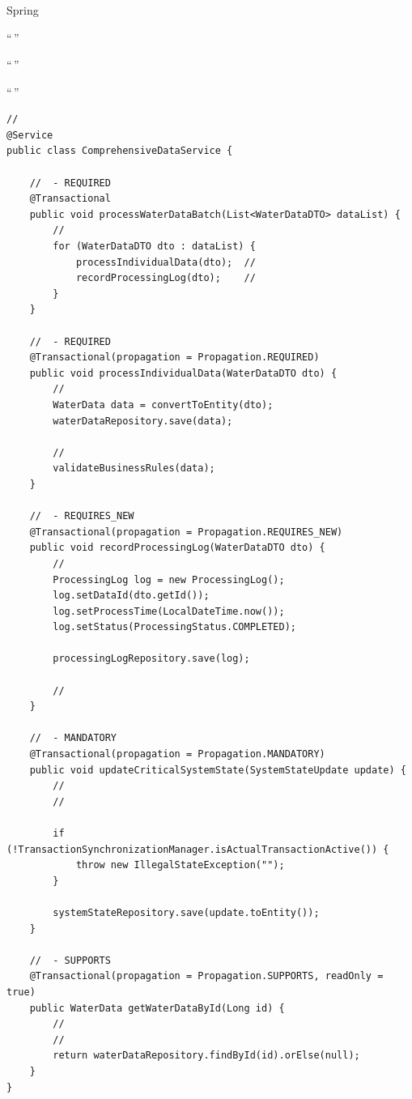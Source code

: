 \hypertarget{section-65}{%
\subsubsection{}\label{section-65}}

Spring

``\,''

``\,''

``\,''

\begin{lstlisting}[style=java]
// 
@Service
public class ComprehensiveDataService {
    
    //  - REQUIRED
    @Transactional
    public void processWaterDataBatch(List<WaterDataDTO> dataList) {
        // 
        for (WaterDataDTO dto : dataList) {
            processIndividualData(dto);  // 
            recordProcessingLog(dto);    // 
        }
    }
    
    //  - REQUIRED
    @Transactional(propagation = Propagation.REQUIRED)
    public void processIndividualData(WaterDataDTO dto) {
        // 
        WaterData data = convertToEntity(dto);
        waterDataRepository.save(data);
        
        // 
        validateBusinessRules(data);
    }
    
    //  - REQUIRES_NEW
    @Transactional(propagation = Propagation.REQUIRES_NEW)
    public void recordProcessingLog(WaterDataDTO dto) {
        // 
        ProcessingLog log = new ProcessingLog();
        log.setDataId(dto.getId());
        log.setProcessTime(LocalDateTime.now());
        log.setStatus(ProcessingStatus.COMPLETED);
        
        processingLogRepository.save(log);
        
        // 
    }
    
    //  - MANDATORY
    @Transactional(propagation = Propagation.MANDATORY)
    public void updateCriticalSystemState(SystemStateUpdate update) {
        // 
        // 
        
        if (!TransactionSynchronizationManager.isActualTransactionActive()) {
            throw new IllegalStateException("");
        }
        
        systemStateRepository.save(update.toEntity());
    }
    
    //  - SUPPORTS
    @Transactional(propagation = Propagation.SUPPORTS, readOnly = true)
    public WaterData getWaterDataById(Long id) {
        // 
        // 
        return waterDataRepository.findById(id).orElse(null);
    }
}
\end{lstlisting}

